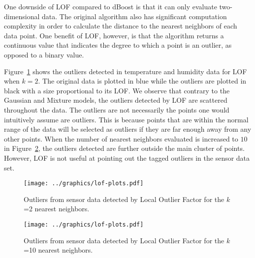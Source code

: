 One downside of LOF compared to dBoost is that it can only evaluate two-dimensional data.
The original algorithm also has significant computation complexity in order to calculate the distance to the nearest neighbors of each data point.
One benefit of LOF, however, is that the algorithm returns a continuous value that indicates the degree to which a point is an outlier, as opposed to a binary value.

Figure~\ref{fig:lof_2} shows the outliers detected in temperature and humidity data for LOF when $k=2$.
The original data is plotted in blue while the outliers are plotted in black with a size proportional to its LOF.
We observe that contrary to the Gaussian and Mixture models, the outliers detected by LOF are scattered throughout the data.
The outliers are not necessarily the points one would intuitively assume are outliers.
This is because points that are within the normal range of the data will be selected as outliers if they are far enough away from any other points.
When the number of nearest neighbors evaluated is increased to $10$ in Figure~\ref{fig:lof_10}, the outliers detected are further outside the main cluster of points.
However, LOF is not useful at pointing out the tagged outliers in the sensor data set.

\begin{figure}[h]
\centering
\texttt{[image: ../graphics/lof-plots.pdf]}
\caption{Outliers from sensor data detected by Local Outlier Factor for the $k$=2 nearest neighbors.}
\label{fig:lof_2}
\end{figure}
\begin{figure}[h]
\centering
\texttt{[image: ../graphics/lof-plots.pdf]}
\caption{Outliers from sensor data detected by Local Outlier Factor for the $k$=10 nearest neighbors.}
\label{fig:lof_10}
\end{figure}

